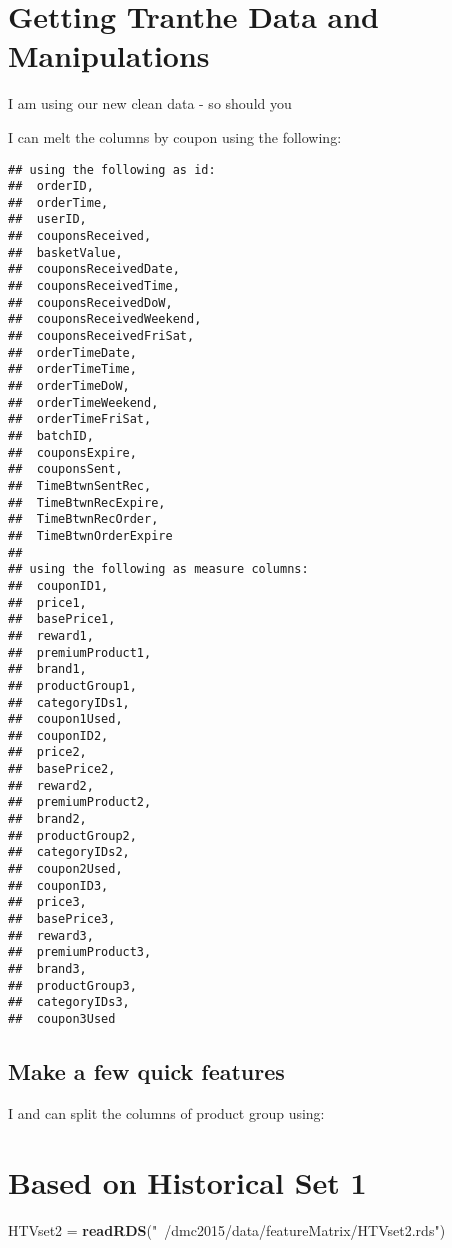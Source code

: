 \documentclass[10pt]{report}
\newenvironment{Shaded}{}{}
\newcommand{\KeywordTok}[1]{\textcolor[rgb]{0.00,0.44,0.13}{\textbf{{#1}}}}
\newcommand{\StringTok}[1]{\textcolor[rgb]{0.25,0.44,0.63}{{#1}}}
\newcommand{\NormalTok}[1]{{#1}}
\begin{document}
\section{Getting Tranthe Data and
Manipulations}\label{getting-tranthe-data-and-manipulations}

I am using our new clean data - so should you

I can melt the columns by coupon using the following:

\begin{verbatim}
## using the following as id:
##  orderID,
##  orderTime,
##  userID,
##  couponsReceived,
##  basketValue,
##  couponsReceivedDate,
##  couponsReceivedTime,
##  couponsReceivedDoW,
##  couponsReceivedWeekend,
##  couponsReceivedFriSat,
##  orderTimeDate,
##  orderTimeTime,
##  orderTimeDoW,
##  orderTimeWeekend,
##  orderTimeFriSat,
##  batchID,
##  couponsExpire,
##  couponsSent,
##  TimeBtwnSentRec,
##  TimeBtwnRecExpire,
##  TimeBtwnRecOrder,
##  TimeBtwnOrderExpire
## 
## using the following as measure columns:
##  couponID1,
##  price1,
##  basePrice1,
##  reward1,
##  premiumProduct1,
##  brand1,
##  productGroup1,
##  categoryIDs1,
##  coupon1Used,
##  couponID2,
##  price2,
##  basePrice2,
##  reward2,
##  premiumProduct2,
##  brand2,
##  productGroup2,
##  categoryIDs2,
##  coupon2Used,
##  couponID3,
##  price3,
##  basePrice3,
##  reward3,
##  premiumProduct3,
##  brand3,
##  productGroup3,
##  categoryIDs3,
##  coupon3Used
\end{verbatim}

\subsection{Make a few quick features}\label{make-a-few-quick-features}

I and can split the columns of product group using:

\section{Based on Historical Set 1}\label{based-on-historical-set-1}

\begin{Shaded}
\begin{Highlighting}[]
\NormalTok{HTVset2 =}\StringTok{ }\KeywordTok{readRDS}\NormalTok{(}\StringTok{"~/dmc2015/data/featureMatrix/HTVset2.rds"}\NormalTok{)}
\end{Highlighting}
\end{Shaded}
\end{document}
